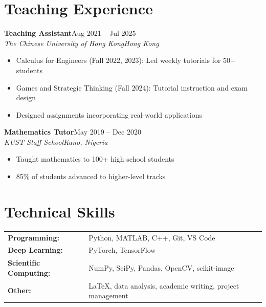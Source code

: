 \documentclass[11pt,a4paper]{article}
\newenvironment{cventry}[4]{%
    \par\noindent\begin{minipage}{\linewidth}%
    \noindent\textbf{#1}\hfill #2\\
    \textit{#3}\hfill\textit{#4}\par\vspace{2pt}%
}{%
    \end{minipage}\par
}
\begin{document}
\section{Teaching Experience}

\begin{cventry}{Teaching Assistant}{Aug 2021 -- Jul 2025}{The Chinese University of Hong Kong}{Hong Kong}
\begin{itemize}[nosep, leftmargin=1.5em]
    \item Calculus for Engineers (Fall 2022, 2023): Led weekly tutorials for 50+ students
    \item Games and Strategic Thinking (Fall 2024): Tutorial instruction and exam design
    \item Designed assignments incorporating real-world applications
\end{itemize}
\end{cventry}
\vspace{6pt}

\begin{cventry}{Mathematics Tutor}{May 2019 -- Dec 2020}{KUST Staff School}{Kano, Nigeria}
\begin{itemize}[nosep, leftmargin=1.5em]
    \item Taught mathematics to 100+ high school students
    \item 85\% of students advanced to higher-level tracks
\end{itemize}
\end{cventry}

\section{Technical Skills}

\begin{tabular}{@{}ll@{}}
\textbf{Programming:} & Python, MATLAB, C++, Git, VS Code \\
\textbf{Deep Learning:} & PyTorch, TensorFlow \\
\textbf{Scientific Computing:} & NumPy, SciPy, Pandas, OpenCV, scikit-image \\
\textbf{Other:} & \LaTeX, data analysis, academic writing, project management
\end{tabular}
\end{document}
